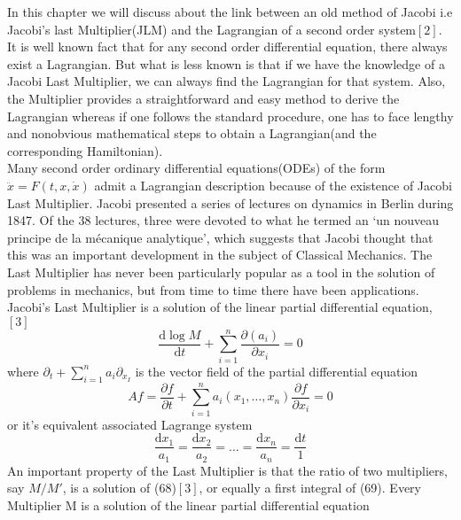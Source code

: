 \documentclass[14pt]{extarticle}
\begin{document}
In this chapter we will discuss about the link between an old method of Jacobi i.e Jacobi's last Multiplier(JLM) and the Lagrangian of a second order system$[2]$. It is well known fact that for any second order differential equation, there always exist a Lagrangian. But what is less known is that if we have the knowledge of a Jacobi Last Multiplier, we can always find the Lagrangian for that system. Also, the Multiplier provides a straightforward and easy method to derive the Lagrangian  whereas if one follows the standard procedure, one has to face lengthy and nonobvious mathematical steps to obtain a Lagrangian(and the corresponding Hamiltonian).\\
Many second order ordinary differential equations(ODEs) of the form $\ddot{x}=F(t,x,\dot{x})$ admit a Lagrangian description because of the existence of Jacobi Last Multiplier. Jacobi presented a series of lectures on dynamics in Berlin during 1847. Of the 38 lectures, three were devoted to what he termed an ‘un nouveau principe de la mécanique analytique’, which suggests that Jacobi thought that this was an important
development in the subject of Classical Mechanics. The Last Multiplier has never been particularly popular as a tool in the solution of problems in mechanics, but from time to time there have been applications.\\
Jacobi's Last Multiplier is a solution of the linear partial differential equation,$[3]$ \\
\begin{equation}
\frac{\mathrm{d} \log M}{\mathrm{d} t}+\sum_{i=1}^{n} \frac{\partial\left(a_{i}\right)}{\partial x_{i}}=0
\end{equation}
where $\partial_{t}+\sum_{i=1}^{n} a_{i} \partial_{x_{I}}$ is the vector field of the partial differential equation\\
\begin{equation}
A f=\frac{\partial f}{\partial t}+\sum_{i=1}^{n} a_{i}\left(x_{1}, \ldots, x_{n}\right) \frac{\partial f}{\partial x_{i}}=0
\end{equation}
or it's equivalent associated Lagrange system \\
\begin{equation}
\frac{\mathrm{d} x_{1}}{a_{1}}=\frac{\mathrm{d} x_{2}}{a_{2}}=\ldots=\frac{\mathrm{d} x_{n}}{a_{n}}=\frac{\mathrm{d} t}{1}
\end{equation}
An important property of the Last Multiplier is that the ratio of two multipliers, say $M/M'$, is a solution of (68)$[3]$, or equally a first integral of (69). Every Multiplier M is a solution of the linear partial differential equation\\
\end{document}
